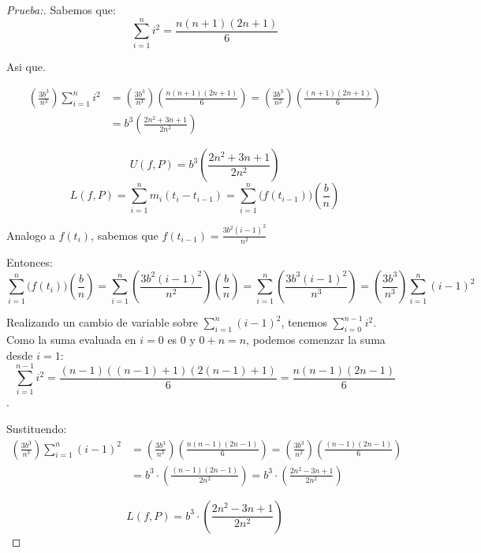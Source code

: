 \documentclass[12pt]{article}
\begin{document}
\begin{enumerate}[\hspace{9px} a)]
\begin{proof}[Prueba:]
            Sabemos que: \[\sum_{i=1}^n i^2 = \frac{n(n+1)(2n+1)}{6}\]

            Asi que.

            \begin{align*}
                \left(\frac{3b^3}{n^3}\right) \sum_{i=1}^n i^2 &= \left(\frac{3b^3}{n^3}\right)\left(\frac{n(n+1)(2n+1)}{6}\right) = \left(\frac{3b^3}{n^2}\right)\left(\frac{(n+1)(2n+1)}{6}\right) \\
                &= b^3\left(\frac{2n^2+3n+1}{2n^2}\right)
            \end{align*}

            \[U(f,P)=b^3\left(\frac{2n^2+3n+1}{2n^2}\right)\]
            \begin{equation*}
                L(f,P)=\sum_{i=1}^n m_i(t_i-t_{i-1}) = \sum_{i=1}^n \big(f(t_{i-1})\big)\left(\displaystyle\frac{b}{n}\right)
            \end{equation*}

            Analogo a \(f(t_i)\), sabemos que \(f(t_{i-1})=\displaystyle\frac{3b^2(i-1)^2}{n^2}\)

            Entonces:
            \begin{equation*}
                \sum_{i=1}^n \big(f(t_i)\big)\left(\displaystyle\frac{b}{n}\right) = \sum_{i=1}^n \left(\frac{3b^2(i-1)^2}{n^2}\right)\left(\displaystyle\frac{b}{n}\right) = \sum_{i=1}^n \left(\frac{3b^3(i-1)^2}{n^3}\right) = \left(\frac{3b^3}{n^3}\right) \sum_{i=1}^n (i-1)^2
            \end{equation*}

            Realizando un cambio de variable sobre \(\sum_{i=1}^n (i-1)^2\), tenemos \(\sum_{i=0}^{n-1} i^2\). Como la suma evaluada en $i=0$ es 0 y \(0+n=n\), podemos comenzar la suma desde \(i=1\): \[\sum_{i=1}^{n-1} i^2 = \displaystyle\frac{(n-1)((n-1)+1)(2(n-1)+1)}{6} = \frac{n(n-1)(2n-1)}{6}\].

            Sustituendo:
            \begin{align*}
                \left(\frac{3b^3}{n^3}\right)\sum_{i=1}^n (i-1)^2 &= \left(\frac{3b^3}{n^3}\right)\left(\frac{n(n-1)(2n-1)}{6}\right) = \left(\frac{3b^3}{n^2}\right)\left(\frac{(n-1)(2n-1)}{6}\right) \\
                &= b^3\cdot\left(\frac{(n-1)(2n-1)}{2n^2}\right) = b^3\cdot\left(\frac{2n^2-3n+1}{2n^2}\right)
            \end{align*}

            \[L(f,P)=b^3\cdot\left(\frac{2n^2-3n+1}{2n^2}\right)\]


\end{proof}
\end{enumerate}
\end{document}
